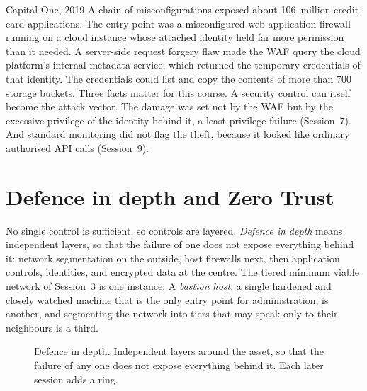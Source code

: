 \begin{realworld}{Capital One, 2019}
A chain of misconfigurations exposed about 106~million credit-card
applications. The entry point was a misconfigured web application firewall
running on a cloud instance whose attached identity held far more permission
than it needed. A server-side request forgery flaw made the WAF query the
cloud platform's internal metadata service, which returned the temporary
credentials of that identity. The credentials could list and copy the
contents of more than 700 storage buckets. Three facts matter for this course. A security control can itself become
the attack vector. The damage was set not by the WAF but by the excessive
privilege of the identity behind it, a least-privilege failure (Session~7).
And standard monitoring did not flag the theft, because it looked like
ordinary authorised API calls (Session~9).
\end{realworld}

\section{Defence in depth and Zero Trust}

No single control is sufficient, so controls are layered. \emph{Defence in
depth} means independent layers, so that the failure of one does not expose
everything behind it: network segmentation on the outside, host firewalls
next, then application controls, identities, and encrypted data at the
centre. The tiered minimum viable network of Session~3 is one instance. A
\emph{bastion host}, a single hardened and closely watched machine that is
the only entry point for administration, is another, and segmenting the
network into tiers that may speak only to their neighbours is a third.

\begin{figure}[htbp]
\centering
{}
\caption{Defence in depth. Independent layers around the asset, so that the
failure of any one does not expose everything behind it. Each later session
adds a ring.}
\label{fig:depth}
\end{figure}

